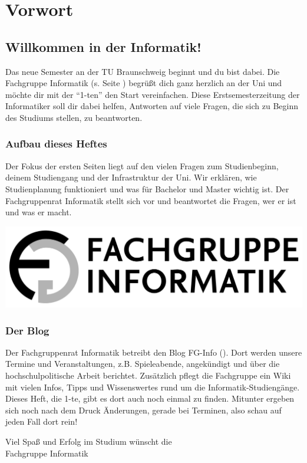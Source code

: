
\section{Vorwort}
\label{vorwort}
	\begin{multicols}{2}
	\subsection*{Willkommen in der Informatik!}	

	Das neue Semester an der TU Braunschweig beginnt und du bist dabei. Die Fachgruppe Informatik (s. Seite \pageref{fachgruppe}) begrüßt dich ganz herzlich an der Uni und möchte dir mit der \enquote{1-ten} den Start vereinfachen. Diese Erstsemesterzeitung der Informatiker soll dir dabei helfen, Antworten auf viele Fragen, die sich zu Beginn des Studiums stellen, zu beantworten.

	\subsubsection*{Aufbau dieses Heftes}
		Der Fokus der ersten Seiten liegt auf den vielen Fragen zum Studienbeginn, deinem Studiengang und der Infrastruktur der Uni. Wir erklären, wie Studienplanung funktioniert und was für Bachelor und Master wichtig ist.
Der Fachgruppenrat Informatik stellt sich vor und beantwortet die Fragen, wer er ist und was er macht.


	\columnbreak

	\begin{center}
		\includegraphics[width=.7\columnwidth]{bilder/fg-logo/fg-logo.pdf}
	\end{center}

	\subsubsection*{Der Blog}
		Der Fachgruppenrat Informatik betreibt den Blog FG-Info (\fginfoUrl). Dort werden unsere Termine und Veranstaltungen, z.B. Spieleabende, angekündigt und über die hochschulpolitische Arbeit berichtet.
Zusätzlich pflegt die Fachgruppe ein Wiki mit vielen Infos, Tipps und Wissenswertes rund um die Informatik-Studiengänge.
Dieses Heft, die 1-te, gibt es dort auch noch einmal zu finden. Mitunter
ergeben sich noch nach dem Druck Änderungen, gerade bei Terminen, also schau auf jeden Fall dort rein!

	\vspace*{0.5cm}

	Viel Spaß und Erfolg im  Studium wünscht  die\\
	\hspace*{2cm}Fachgruppe Informatik

	\end{multicols}
